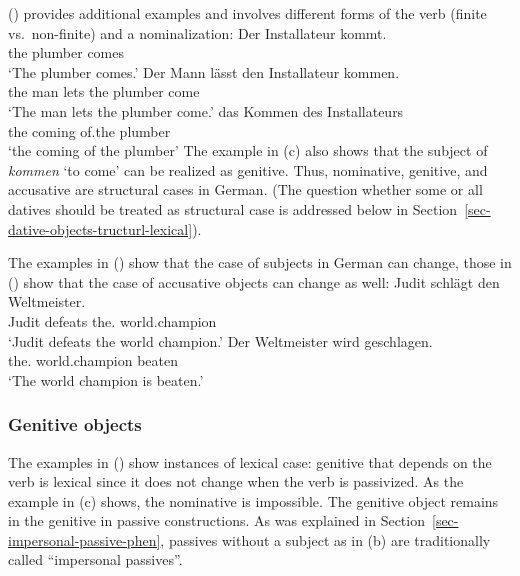 () provides additional examples and involves different forms of the verb (finite
vs.\ non-finite) and a nominalization:
\eal
\ex 
\gll Der Installateur kommt.\\
     the plumber      comes\\
\glt `The plumber comes.'
\ex 
\gll Der Mann lässt den Installateur kommen.\\
     the man  lets the plumber      come\\
\glt `The man lets the plumber come.'
\ex 
\gll das Kommen des Installateurs\\
     the coming of.the plumber\\
\glt `the coming of the plumber'
\zl
The example in (c) also shows that the subject of \emph{kommen} `to come' can be realized as
genitive. Thus, nominative, genitive, and accusative are structural cases in German. (The question
whether some or all datives should be treated as structural case is addressed below in Section~\ref{sec-dative-objects-tructurl-lexical}).

The examples in () show that the case of subjects in German can change, those in ()
show that the case of accusative objects can change as well:
\eal
\ex 
\gll Judit schlägt den Weltmeister.\\
     Judit defeats the.\ACC{} world.champion\\
\glt `Judit defeats the world champion.'
\ex 
\gll Der        Weltmeister    wird   geschlagen.\\
     the.\NOM{} world.champion \AUX{} beaten\\
\glt `The world champion is beaten.'
\zl

\subsubsection{Genitive objects}

The examples in () show instances of lexical case: genitive that depends on the verb is
lexical since it does not change when the verb is passivized.
\eal
{}
\zl
As the example in (c) shows, the nominative is impossible. The genitive object remains in the
genitive in passive constructions. As was explained in Section~\ref{sec-impersonal-passive-phen},
passives without a subject as in (b) are traditionally called ``impersonal passives''.


